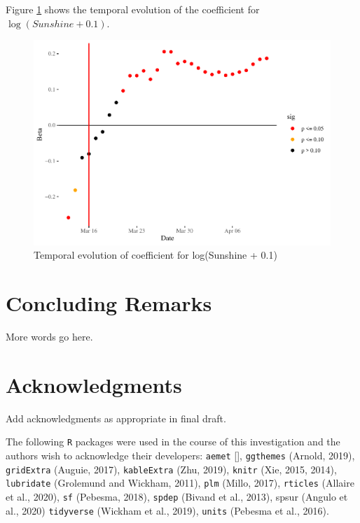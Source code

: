 \documentclass[]{elsarticle} %
\makeatletter
\def\maxwidth{\ifdim\Gin@nat@width>\linewidth\linewidth
\else\Gin@nat@width\fi}
\let\Oldincludegraphics\includegraphics
\renewcommand{\includegraphics}[1]{\Oldincludegraphics[width=\maxwidth]{#1}}
\makeatother
\begin{document}
Figure \ref{fig:beta-sunshine-time} shows the temporal evolution of the
coefficient for \(\log(Sunshine + 0.1)\).

\begin{figure}
\centering
\includegraphics{Environmental-Correlates-of-COVID19-Spain_files/figure-latex/beta-sunshine-time-1.pdf}
\caption{\label{fig:beta-sunshine-time}Temporal evolution of coefficient
for log(Sunshine + 0.1)}
\end{figure}

\hypertarget{concluding-remarks}{%
\section{Concluding Remarks}\label{concluding-remarks}}

More words go here.

\hypertarget{acknowledgments}{%
\section*{Acknowledgments}\label{acknowledgments}}

Add acknowledgments as appropriate in final draft.

The following \texttt{R} packages were used in the course of this
investigation and the authors wish to acknowledge their developers:
\texttt{aemet} {[}{]}, \texttt{ggthemes} (Arnold, 2019),
\texttt{gridExtra} (Auguie, 2017), \texttt{kableExtra} (Zhu, 2019),
\texttt{knitr} (Xie, 2015, 2014), \texttt{lubridate} (Grolemund and
Wickham, 2011), \texttt{plm} (Millo, 2017), \texttt{rticles} (Allaire et
al., 2020), \texttt{sf} (Pebesma, 2018), \texttt{spdep} (Bivand et al.,
2013), spsur (Angulo et al., 2020) \texttt{tidyverse} (Wickham et al.,
2019), \texttt{units} (Pebesma et al., 2016).
\end{document}
